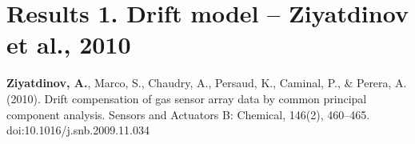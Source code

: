 
\thispagestyle{empty}


\begingroup
\let\clearpage\relax
\let\cleardoublepage\relax
\let\cleardoublepage\relax


\medskip

  {
    \section{Results 1. Drift model -- Ziyatdinov et al., 2010}\label{pub1}
  }


\noindent \textbf{Ziyatdinov, A.}, Marco, S., Chaudry, A., Persaud, K., Caminal, P., \& Perera, A. (2010). 
Drift compensation of gas sensor array data by common principal component analysis. 
Sensors and Actuators B: Chemical, 146(2), 460--465. doi:10.1016/j.snb.2009.11.034
\cite{Ziyatdinov2010}

\endgroup			

\vfill
